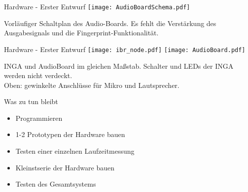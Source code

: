 \documentclass[fleqn,11pt]{beamer}
\begin{document}
\begin{frame}{Hardware - Erster Entwurf}
	\texttt{[image: AudioBoardSchema.pdf]}
	
	Vorläufiger Schaltplan des Audio-Boards. Es fehlt die Verstärkung des Ausgabesignals und die Fingerprint-Funktionalität.
\end{frame}

\begin{frame}{Hardware - Erster Entwurf}
	\texttt{[image: ibr\_node.pdf]}
	\texttt{[image: AudioBoard.pdf]}
	
	INGA und AudioBoard im gleichen Maßstab. Schalter und LEDs der INGA werden nicht verdeckt. \\
	Oben: gewinkelte Anschlüsse für Mikro und Lautsprecher.
\end{frame}


\begin{frame}{Was zu tun bleibt}
	\begin{itemize}
		\item Programmieren
		\item 1-2 Prototypen der Hardware bauen
		\item Testen einer einzelnen Laufzeitmessung
		\item Kleinstserie der Hardware bauen
		\item Testen des Gesamtsystems
	\end{itemize}
\end{frame}
\end{document}
